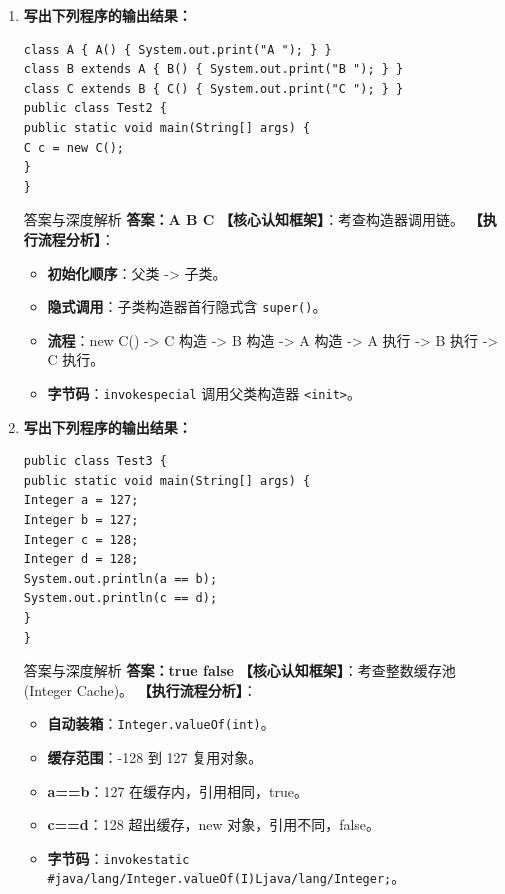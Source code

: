 \documentclass[12pt, a4paper]{ctexart}
\newcommand{\code}[1]{\texttt{\color{myblue}#1}}
\begin{document}
\begin{enumerate}[label=\arabic*.]
	\item \textbf{写出下列程序的输出结果：}
	      \begin{lstlisting}
class A { A() { System.out.print("A "); } }
class B extends A { B() { System.out.print("B "); } }
class C extends B { C() { System.out.print("C "); } }
public class Test2 {
public static void main(String[] args) {
C c = new C();
}
}
\end{lstlisting}
	      \begin{bluebox}{答案与深度解析}
		      \textbf{答案：A B C }
		      \textbf{【核心认知框架】}：考查构造器调用链。
		      \textbf{【执行流程分析】}：
		      \begin{itemize}[leftmargin=*, nosep]
			      \item \textbf{初始化顺序}：父类 -> 子类。
			      \item \textbf{隐式调用}：子类构造器首行隐式含 \code{super()}。
			      \item \textbf{流程}：new C() -> C 构造 -> B 构造 -> A 构造 -> A 执行 -> B 执行 -> C 执行。
			      \item \textbf{字节码}：\code{invokespecial} 调用父类构造器 \code{<init>}。
		      \end{itemize}
	      \end{bluebox}

	\item \textbf{写出下列程序的输出结果：}
	      \begin{lstlisting}
public class Test3 {
public static void main(String[] args) {
Integer a = 127;
Integer b = 127;
Integer c = 128;
Integer d = 128;
System.out.println(a == b);
System.out.println(c == d);
}
}
\end{lstlisting}
	      \begin{bluebox}{答案与深度解析}
		      \textbf{答案：true false}
		      \textbf{【核心认知框架】}：考查整数缓存池 (Integer Cache)。
		      \textbf{【执行流程分析】}：
		      \begin{itemize}[leftmargin=*, nosep]
			      \item \textbf{自动装箱}：\code{Integer.valueOf(int)}。
			      \item \textbf{缓存范围}：-128 到 127 复用对象。
			      \item \textbf{a==b}：127 在缓存内，引用相同，true。
			      \item \textbf{c==d}：128 超出缓存，new 对象，引用不同，false。
			      \item \textbf{字节码}：\code{invokestatic \#java/lang/Integer.valueOf(I)Ljava/lang/Integer;}。
		      \end{itemize}
	      \end{bluebox}


\end{enumerate}
\end{document}
